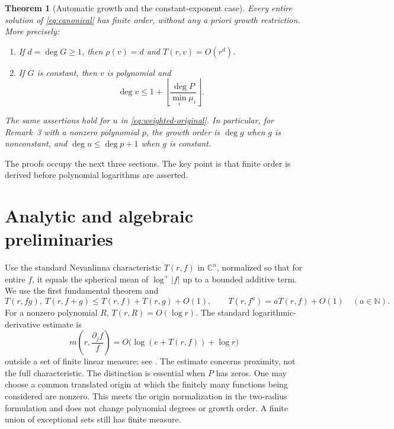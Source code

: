 \documentclass[11pt]{article}
\numberwithin{equation}{section}
\newtheorem{theorem}{Theorem}[section]
\theoremstyle{definition}\newtheorem{definition}[theorem]{Definition}
\theoremstyle{remark}\newtheorem{remark}[theorem]{Remark}
\newcommand{\C}{\mathbb C}
\newcommand{\N}{\mathbb N}
\begin{document}
\begin{theorem}[Automatic growth and the constant-exponent case]\label{thm:growth}
Every entire solution of \eqref{eq:canonical} has finite order, without
any a priori growth restriction. More precisely:
\begin{enumerate}[label=(\roman*),leftmargin=*]
\item If $d=\deg G\geq1$, then $\rho(v)=d$ and
$T(r,v)=O(r^d)$.
\item If $G$ is constant, then $v$ is polynomial and
\begin{equation}\label{eq:degree}
 \deg v\leq 1+\left\lfloor\frac{\deg P}{\min_i\mu_i}\right\rfloor.
\end{equation}
\end{enumerate}
The same assertions hold for $u$ in \eqref{eq:weighted-original}.
In particular, for Remark~3 with a nonzero polynomial $p$, the growth order
is $\deg g$ when $g$ is nonconstant, and $\deg u\leq\deg p+1$ when $g$
is constant.
\end{theorem}

The proofs occupy the next three sections. The key point is that finite
order is derived before polynomial logarithms are asserted.

\section{Analytic and algebraic preliminaries}
Use the standard Nevanlinna characteristic $T(r,f)$ in $\C^n$, normalized
so that for entire $f$, it equals the spherical mean of $\log^+|f|$ up
to a bounded additive term. We use the first fundamental theorem and
\[
 T(r,fg),\ T(r,f+g)\leq T(r,f)+T(r,g)+O(1),\qquad
 T(r,f^a)=aT(r,f)+O(1)\quad(a\in\N).
\]
For a nonzero polynomial $R$, $T(r,R)=O(\log r)$. The standard
logarithmic-derivative estimate is
\begin{equation}\label{eq:LD}
 m\left(r,\frac{\partial_jf}{f}\right)
 =O\bigl(\log(e+T(r,f))+\log r\bigr)
\end{equation}
outside a set of finite linear measure; see
\cite{Vitter1977,HanLiu2025}. The estimate concerns proximity, not the full
characteristic. The distinction is essential when $P$ has zeros.
One may choose a common translated origin at which the finitely many
functions being considered are nonzero. This meets the origin
normalization in the two-radius formulation and does not change polynomial
degrees or growth order. A finite union of exceptional sets still has
finite measure.
\end{document}
